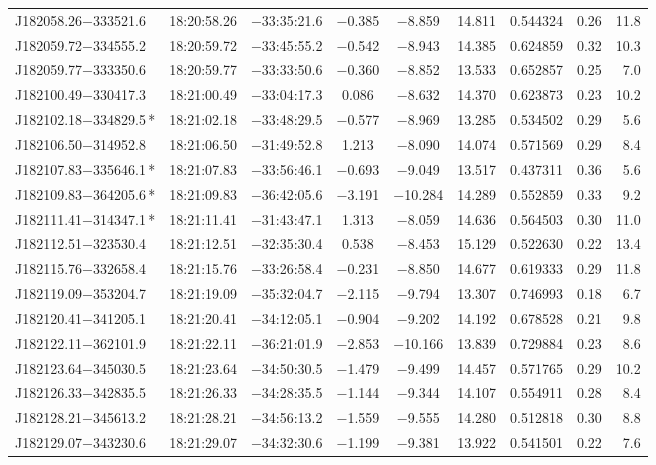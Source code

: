\begin{table*}
\begin{tabular}{lcccccccr}
J182058.26$-$333521.6 & 18:20:58.26 & $-$33:35:21.6 & $-$0.385 & $-$8.859 & 14.811 & 0.544324 & 0.26 & 11.8 \\
J182059.72$-$334555.2 & 18:20:59.72 & $-$33:45:55.2 & $-$0.542 & $-$8.943 & 14.385 & 0.624859 & 0.32 & 10.3 \\
J182059.77$-$333350.6 & 18:20:59.77 & $-$33:33:50.6 & $-$0.360 & $-$8.852 & 13.533 & 0.652857 & 0.25 & 7.0 \\
J182100.49$-$330417.3 & 18:21:00.49 & $-$33:04:17.3 &  0.086 & $-$8.632 & 14.370 & 0.623873 & 0.23 & 10.2 \\
J182102.18$-$334829.5\,* & 18:21:02.18 & $-$33:48:29.5 & $-$0.577 & $-$8.969 & 13.285 & 0.534502 & 0.29 & 5.6 \\
J182106.50$-$314952.8 & 18:21:06.50 & $-$31:49:52.8 &  1.213 & $-$8.090 & 14.074 & 0.571569 & 0.29 & 8.4 \\
J182107.83$-$335646.1\,* & 18:21:07.83 & $-$33:56:46.1 & $-$0.693 & $-$9.049 & 13.517 & 0.437311 & 0.36 & 5.6 \\
J182109.83$-$364205.6\,* & 18:21:09.83 & $-$36:42:05.6 & $-$3.191 & $-$10.284 & 14.289 & 0.552859 & 0.33 & 9.2 \\
J182111.41$-$314347.1\,* & 18:21:11.41 & $-$31:43:47.1 &  1.313 & $-$8.059 & 14.636 & 0.564503 & 0.30 & 11.0 \\
J182112.51$-$323530.4 & 18:21:12.51 & $-$32:35:30.4 &  0.538 & $-$8.453 & 15.129 & 0.522630 & 0.22 & 13.4 \\
J182115.76$-$332658.4 & 18:21:15.76 & $-$33:26:58.4 & $-$0.231 & $-$8.850 & 14.677 & 0.619333 & 0.29 & 11.8 \\
J182119.09$-$353204.7 & 18:21:19.09 & $-$35:32:04.7 & $-$2.115 & $-$9.794 & 13.307 & 0.746993 & 0.18 & 6.7 \\
J182120.41$-$341205.1 & 18:21:20.41 & $-$34:12:05.1 & $-$0.904 & $-$9.202 & 14.192 & 0.678528 & 0.21 & 9.8 \\
J182122.11$-$362101.9 & 18:21:22.11 & $-$36:21:01.9 & $-$2.853 & $-$10.166 & 13.839 & 0.729884 & 0.23 & 8.6 \\
J182123.64$-$345030.5 & 18:21:23.64 & $-$34:50:30.5 & $-$1.479 & $-$9.499 & 14.457 & 0.571765 & 0.29 & 10.2 \\
J182126.33$-$342835.5 & 18:21:26.33 & $-$34:28:35.5 & $-$1.144 & $-$9.344 & 14.107 & 0.554911 & 0.28 & 8.4 \\
J182128.21$-$345613.2 & 18:21:28.21 & $-$34:56:13.2 & $-$1.559 & $-$9.555 & 14.280 & 0.512818 & 0.30 & 8.8 \\
J182129.07$-$343230.6 & 18:21:29.07 & $-$34:32:30.6 & $-$1.199 & $-$9.381 & 13.922 & 0.541501 & 0.22 & 7.6 \\

\end{tabular}
\end{table*}
